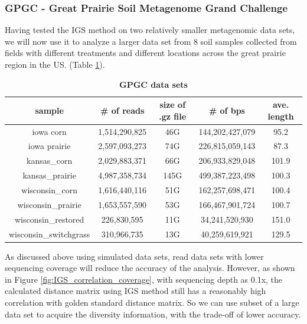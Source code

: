 \documentclass{article}
\begin{document}
\subsubsection{GPGC - Great Prairie Soil Metagenome Grand Challenge}

Having tested the IGS method on two relatively smaller metagenomic data sets, 
we will now use it to analyze 
a larger data set from 8 soil samples collected from fields with different treatments and
different locations across the great prairie region in the US. 
(Table \ref{table:gpgc}). 



\begin{table}[h]
\centering
\begin{tabular}{|c|c|c|c|c|}
\hline
sample & \# of reads & size of .gz file & \# of bps & ave. length \\ \hline
iowa corn & 1,514,290,825 & 46G & 144,202,427,079 & 95.2 \\ 
iowa prairie & 2,597,093,273 & 74G & 226,815,059,143 & 87.3 \\ 
kansas\_corn & 2,029,883,371 & 66G & 206,933,829,048 & 101.9 \\ 
kansas\_prairie & 4,987,358,734 & 145G & 499,387,223,498 & 100.3 \\ 
wisconsin\_corn & 1,616,440,116 & 51G & 162,257,698,471 & 100.4 \\ 
wisconsin\_prairie & 1,653,557,590 & 53G & 166,467,901,724 & 100.7 \\
wisconsin\_restored & 226,830,595 & 11G & 34,241,520,930 & 151.0 \\ 
wisconsin\_switchgrass & 310,966,735 & 13G & 40,259,619,921 & 129.5 \\ \hline
\end{tabular}
\caption{\bf{GPGC data sets}}
\label{table:gpgc}
\end{table}



As discussed above using simulated data sets, read data sets with lower sequencing coverage will reduce
the accuracy of the analysis. However, as shown in Figure \ref{fig:IGS_correlation_coverage}, with sequencing depth
as 0.1x, the calculated distance matrix using IGS method still has a reasonably high correlation with golden standard
distance matrix. So we can use subset of a large data set to acquire the diversity information, with the trade-off of
lower accuracy. 
\end{document}
